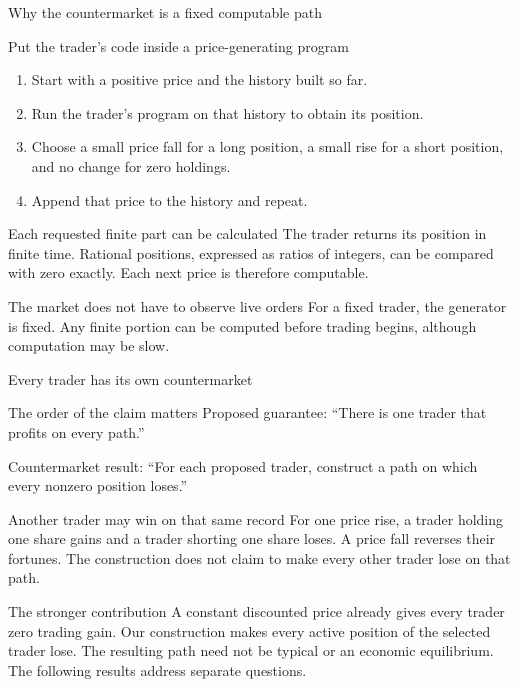 \documentclass{beamer}
\begin{document}
\begin{frame}{Why the countermarket is a fixed computable path}
\small
\begin{block}{Put the trader's code inside a price-generating program}
\begin{enumerate}
\setlength{\itemsep}{0.45em}
\item Start with a positive price and the history built so far.
\item Run the trader's program on that history to obtain its position.
\item Choose a small price fall for a long position, a small rise for a
short position, and no change for zero holdings.
\item Append that price to the history and repeat.
\end{enumerate}
\end{block}
\begin{exampleblock}{Each requested finite part can be calculated}
The trader returns its position in finite time. Rational positions, expressed
as ratios of integers, can be compared with zero exactly. Each next price is therefore
computable.
\end{exampleblock}
\begin{alertblock}{The market does not have to observe live orders}
For a fixed trader, the generator is fixed. Any finite portion can be
computed before trading begins, although computation may be slow.
\end{alertblock}
\end{frame}

\begin{frame}{Every trader has its own countermarket}
\small
\begin{block}{The order of the claim matters}
Proposed guarantee: \enquote{There is one trader that profits on every path.}
\par\medskip
Countermarket result: \enquote{For each proposed trader, construct a path
on which every nonzero position loses.}
\end{block}
\begin{exampleblock}{Another trader may win on that same record}
For one price rise, a trader holding one share gains and a trader shorting
one share loses. A price fall reverses their fortunes.
The construction does not claim to make every other trader lose on that path.
\end{exampleblock}
\begin{alertblock}{The stronger contribution}
A constant discounted price already gives every trader zero trading gain.
Our construction makes every active position of the selected trader lose.
The resulting path need not be typical or an economic equilibrium.
The following results address separate questions.
\end{alertblock}
\end{frame}
\end{document}

